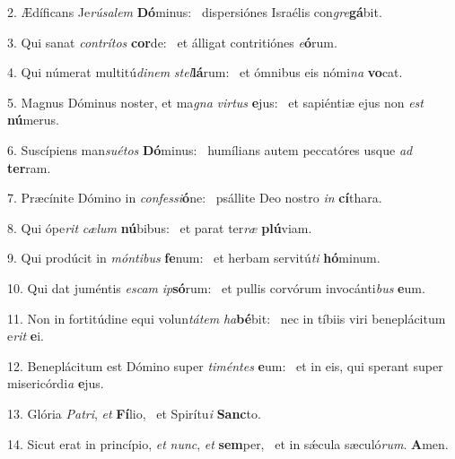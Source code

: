 2. Ædíficans Je\textit{rú}\textit{sa}\textit{lem} \textbf{Dó}minus: \ast\  dispersiónes Israélis con\textit{gre}\textbf{gá}bit.\

3. Qui sanat \textit{con}\textit{trí}\textit{tos} \textbf{cor}de: \ast\  et álligat contritiónes \textit{e}\textbf{ó}rum.\

4. Qui númerat multitú\textit{di}\textit{nem} \textit{stel}\textbf{lá}rum: \ast\  et ómnibus eis nómi\textit{na} \textbf{vo}cat.\

5. Magnus Dóminus noster, et ma\textit{gna} \textit{vir}\textit{tus} \textbf{e}jus: \ast\  et sapiéntiæ ejus non \textit{est} \textbf{nú}merus.\

6. Suscípiens man\textit{su}\textit{é}\textit{tos} \textbf{Dó}minus: \ast\  humílians autem peccatóres usque \textit{ad} \textbf{ter}ram.\

7. Præcínite Dómino in \textit{con}\textit{fes}\textit{si}\textbf{ó}ne: \ast\  psállite Deo nostro \textit{in} \textbf{cí}thara.\

8. Qui ópe\textit{rit} \textit{cæ}\textit{lum} \textbf{nú}bibus: \ast\  et parat ter\textit{ræ} \textbf{plú}viam.\

9. Qui prodúcit in \textit{món}\textit{ti}\textit{bus} \textbf{fe}num: \ast\  et herbam servitú\textit{ti} \textbf{hó}minum.\

10. Qui dat juméntis \textit{es}\textit{cam} \textit{ip}\textbf{só}rum: \ast\  et pullis corvórum invocánti\textit{bus} \textbf{e}um.\

11. Non in fortitúdine equi volun\textit{tá}\textit{tem} \textit{ha}\textbf{bé}bit: \ast\  nec in tíbiis viri beneplácitum e\textit{rit} \textbf{e}i.\

12. Beneplácitum est Dómino super \textit{ti}\textit{mén}\textit{tes} \textbf{e}um: \ast\  et in eis, qui sperant super misericórdi\textit{a} \textbf{e}jus.\

13. Glória \textit{Pa}\textit{tri}, \textit{et} \textbf{Fí}lio, \ast\  et Spirítu\textit{i} \textbf{Sanc}to.\

14. Sicut erat in princípio, \textit{et} \textit{nunc}, \textit{et} \textbf{sem}per, \ast\  et in sǽcula sæculó\textit{rum}. \textbf{A}men.\


